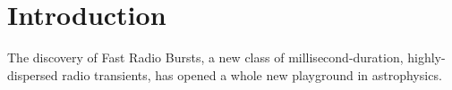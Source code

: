 \section{Introduction}

The discovery of Fast Radio Bursts, a new class of millisecond-duration, highly-dispersed radio transients, has opened a whole new playground in astrophysics. 
